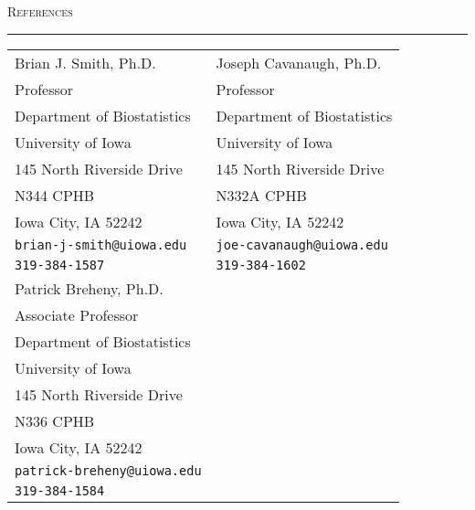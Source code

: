 \documentclass[a4paper]{article}
\begin{document}
\newpage

\begin{flushleft}
  \Large\textsc{References}
  \textcolor{usafagrey}{\rule[0.5\baselineskip]{\textwidth}{0.75pt}}
\end{flushleft}
\vspace{-\baselineskip}

\begin{tabular*}{0.9\textwidth}{@{\extracolsep{\fill}}ll}
  Brian J. Smith, Ph.D.              & Joseph Cavanaugh, Ph.D.\\
  Professor                          & Professor \\
  Department of Biostatistics        & Department of Biostatistics \\
  University of Iowa                 & University of Iowa \\
  145 North Riverside Drive          & 145 North Riverside Drive \\
  N344 CPHB                          & N332A CPHB \\
  Iowa City, IA 52242                & Iowa City, IA 52242 \\
  \texttt{brian-j-smith@uiowa.edu}   & \texttt{joe-cavanaugh@uiowa.edu} \\
  \texttt{319-384-1587}              & \texttt{319-384-1602} \\[10pt]
  Patrick Breheny, Ph.D.             \\
  Associate Professor                \\
  Department of Biostatistics        \\
  University of Iowa                 \\
  145 North Riverside Drive          \\
  N336 CPHB                          \\
  Iowa City, IA 52242                \\
  \texttt{patrick-breheny@uiowa.edu} \\
  \texttt{319-384-1584}
\end{tabular*}


\end{document}
